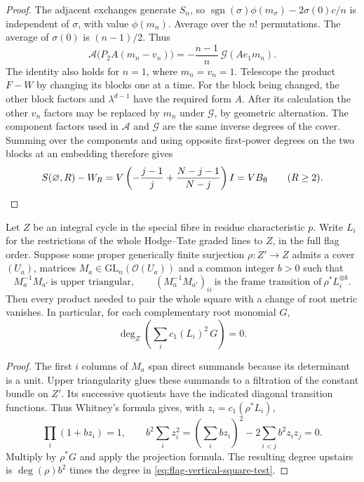 \begin{proof}
The adjacent exchanges generate \(S_n\), so
\(\operatorname{sgn}(\sigma)\phi(m_\sigma)-
2\sigma(0)c/n\) is independent of \(\sigma\), with value
\(\phi(m_n)\). Average over the \(n!\) permutations.
The average of \(\sigma(0)\) is \((n-1)/2\). Thus
\[
 \mathcal A\bigl(P_2 A(m_n-v_n)\bigr)
     =-\frac{n-1}{n}\,\mathcal G(A e_1 m_n).
\]
The identity also holds for \(n=1\), where \(m_n=v_n=1\).
Telescope the product \(F-W\) by changing its blocks one
at a time. For the block being changed, the other block
factors and \(\lambda^{d-1}\) have the required form \(A\).
After its calculation the other \(v_n\) factors may be
replaced by \(m_n\) under \(\mathcal G\), by geometric
alternation. The component factors used in \(\mathcal A\)
and \(\mathcal G\) are the same inverse degrees of the
cover. Summing over the components and using opposite
first-power degrees on the two blocks at an embedding
therefore gives
\begin{equation}\label{eq:flag-first-limit}
 S(\varnothing,R)-W_R
   =V\left(-\frac{j-1}{j}+\frac{N-j-1}{N-j}\right)I
   =V B_{\rm fl}\qquad (R\ge2).
\end{equation}
\label{cor:covolume-flag-test-6}

\end{proof}

\begin{auxlemma}\label{lem:reduced-vertical-newton}
Let \(Z\) be an integral cycle in the special fibre in residue
characteristic \(p\). Write \(L_i\) for the restrictions of the whole
Hodge--Tate graded lines to \(Z\), in the full flag order. Suppose some
proper generically finite surjection \(\rho:Z'\to Z\) admits a cover
\((U_a)\), matrices \(M_a\in\mathrm{GL}_n(\mathcal O(U_a))\)
and a common integer \(b>0\) such that
\[
 M_a^{-1}M_{a'}\ \text{is upper triangular},\qquad
 (M_a^{-1}M_{a'})_{ii}\ \text{is the frame transition of}\
                      \rho^*L_i^{\otimes b}.
\]
Then every product needed to pair the whole square with a change
of root metric vanishes. In particular, for each complementary
root monomial \(G\),
\begin{equation}\label{eq:flag-vertical-square-test}
      \deg_Z\!\left(\sum_i c_1(L_i)^2\,G\right)=0 .
\end{equation}
\end{auxlemma}
\begin{proof}
The first \(i\) columns of \(M_a\) span direct summands because
its determinant is a unit. Upper triangularity glues these summands
to a filtration of the constant bundle on \(Z'\). Its successive
quotients have the indicated diagonal transition functions. Thus
Whitney's formula gives, with \(z_i=c_1(\rho^*L_i)\),
\[
        \prod_i(1+bz_i)=1,\qquad
 b^2\sum_i z_i^2=\left(\sum_i bz_i\right)^2
                      -2\sum_{i<j}b^2z_i z_j=0 .
\]
Multiply by \(\rho^*G\) and apply the projection formula. The resulting
degree upstairs is \(\deg(\rho)b^2\) times the degree in
\eqref{eq:flag-vertical-square-test}.
\end{proof}

